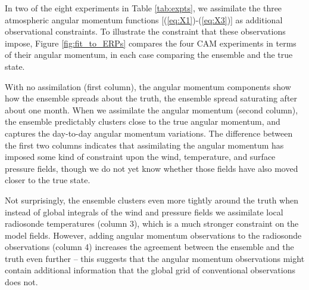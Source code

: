 In two of the eight experiments in Table \ref{tab:expts}, we assimilate the three atmospheric angular momentum functions [(\ref{eq:X1})-(\ref{eq:X3})] as additional observational constraints.
To illustrate the constraint that these observations impose, Figure \ref{fig:fit_to_ERPs} compares the four CAM experiments in terms of their angular momentum, in each case comparing the ensemble and the true state.

With no assimilation (first column), the angular momentum components show how the ensemble spreads about the truth, the ensemble spread saturating after about one month.
When we assimilate the angular momentum (second column), the ensemble predictably clusters close to the true angular momentum, and captures the day-to-day angular momentum variations. 
The difference between the first two columns indicates that assimilating the angular momentum has imposed some kind of constraint upon the wind, temperature, and surface pressure fields, though we do not yet know whether those fields have also moved closer to the true state. 

Not surprisingly, the ensemble clusters even more tightly around the truth when instead of global integrals of the wind and pressure fields we assimilate local radiosonde temperatures (column 3), which is a much stronger constraint on the model fields. 
However, adding angular momentum observations to the radiosonde observations (column 4) increases the agreement between the ensemble and the truth even further -- this suggests that the angular momentum observations might contain additional information that the global grid of conventional observations does not.  



